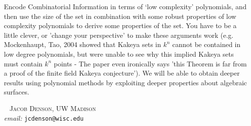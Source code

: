\documentclass{article}
\theoremstyle{plain}
\theoremstyle{definition}
\begin{document}
Encode Combinatorial Information in terms of `low complexity' polynomials, and then use the size of the set in combination with some robust properties of low complexity polynomials to derive some properties of the set. You have to be a little clever, or 'change your perspective' to make these arguments work (e.g. Mockenhaupt, Tao, 2004 showed that Kakeya sets in $k^n$ cannot be contained in low degree polynomials, but were unable to see why this implied Kakeya sets must contain $k^n$ points - The paper even ironically says 'this Theorem is far from a proof of the finite field Kakeya conjecture'). We will be able to obtain deeper results using polynomial methods by exploiting deeper properties about algebraic surfaces.




\begin{comment}

    So far, we have seen the technique of showing a small set is contained in the zero set of a low complexity polynomial.

    In this proof, we took the combinatorial information about the distances of points and encoded it in a family of low complexity polynomials. We obtain *explicit polynomials* of low complexity and use it to obtain a contradiction. Similar arguments involve the 'combinatorial Nullstellensatz'.

    In R^n, we will also consider more topological variants of the arguments, e.g. using the polynomial Ham Sandwich Theorem.

\end{comment}





\ \newline
\noindent \textsc{Jacob Denson, UW Madison}\\
\textit{email:} \texttt{jcdenson@wisc.edu}
\end{document}
